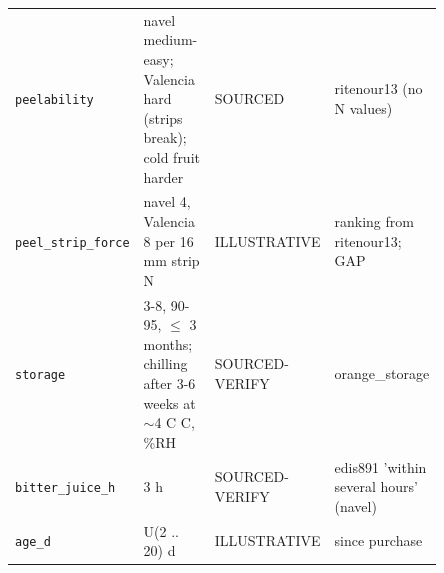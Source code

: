 \documentclass[10.5pt,a4paper]{article}
\begin{document}
{\begin{longtable}{@{}p{0.2\linewidth}p{0.27\linewidth}p{0.12\linewidth}p{0.26\linewidth}@{}}
\texttt{peelability} & navel medium-easy; Valencia hard (strips break); cold fruit harder & SOURCED & ritenour13 (no N values) \\
\texttt{peel\_\allowbreak{}strip\_\allowbreak{}force} & navel 4, Valencia 8 per 16 mm strip N & ILLUSTRATIVE & ranking from ritenour13; GAP \\
\texttt{storage} & 3-8, 90-95, $\le$ 3 months; chilling after 3-6 weeks at $\sim$4 C C, \%RH & SOURCED-VERIFY & orange\_storage \\
\texttt{bitter\_\allowbreak{}juice\_\allowbreak{}h} & 3 h & SOURCED-VERIFY & edis891 'within several hours' (navel) \\
\texttt{age\_\allowbreak{}d} & U(2 .. 20) d & ILLUSTRATIVE & since purchase \\\bottomrule\end{longtable}}
\end{document}
